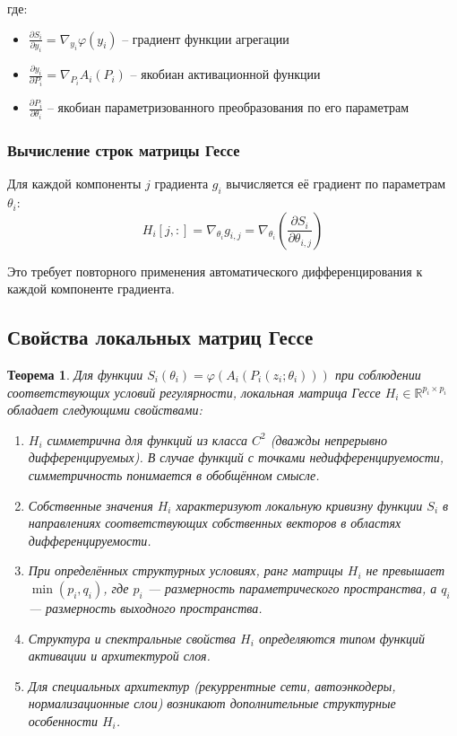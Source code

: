\documentclass[a4paper,12pt]{article}
\newtheorem{theorem}{Теорема}
\begin{document}
где:
\begin{itemize}
\item $\frac{\partial S_i}{\partial y_i} = \nabla_{y_i} \varphi(y_i)$ -- градиент функции агрегации
\item $\frac{\partial y_i}{\partial P_i} = \nabla_{P_i} A_i(P_i)$ -- якобиан активационной функции
\item $\frac{\partial P_i}{\partial \theta_i}$ -- якобиан параметризованного преобразования по его параметрам
\end{itemize}

\subsubsection{Вычисление строк матрицы Гессе}
Для каждой компоненты $j$ градиента $g_i$ вычисляется её градиент по параметрам $\theta_i$:
\begin{equation}
    H_i[j,:] = \nabla_{\theta_i} g_{i,j} = \nabla_{\theta_i} \left( \frac{\partial S_i}{\partial \theta_{i,j}} \right)
\end{equation}

Это требует повторного применения автоматического дифференцирования к каждой компоненте градиента.

\subsection{Свойства локальных матриц Гессе}

\begin{theorem}
    Для функции $S_i(\theta_i) = \varphi(A_i(P_i(z_i; \theta_i)))$ при соблюдении соответствующих условий регулярности, локальная матрица Гессе $H_i \in \mathbb{R}^{p_i \times p_i}$ обладает следующими свойствами:
    \begin{enumerate}
    \item $H_i$ симметрична для функций из класса $C^2$ (дважды непрерывно дифференцируемых). В случае функций с точками недифференцируемости, симметричность понимается в обобщённом смысле.
    \item Собственные значения $H_i$ характеризуют локальную кривизну функции $S_i$ в направлениях соответствующих собственных векторов в областях дифференцируемости.
    \item При определённых структурных условиях, ранг матрицы $H_i$ не превышает $\min(p_i, q_i)$, где $p_i$ — размерность параметрического пространства, а $q_i$ — размерность выходного пространства.
    \item Структура и спектральные свойства $H_i$ определяются типом функций активации и архитектурой слоя.
    \item Для специальных архитектур (рекуррентные сети, автоэнкодеры, нормализационные слои) возникают дополнительные структурные особенности $H_i$.
    \end{enumerate}
    \end{theorem}
    
\end{document}
